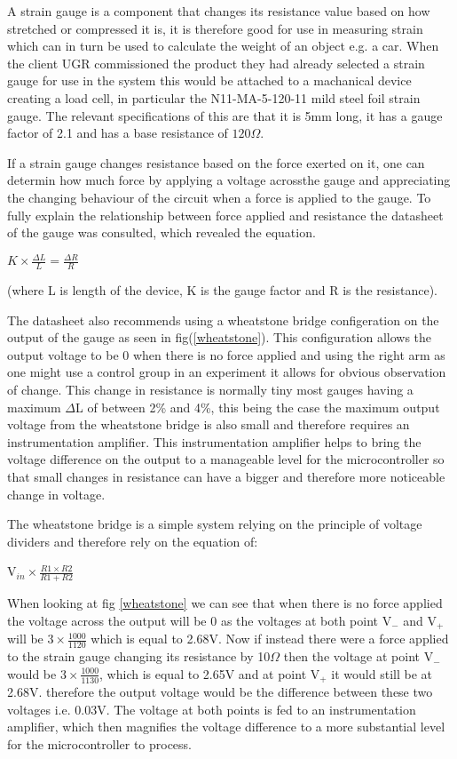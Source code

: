 A strain gauge is a component that changes its resistance value based on how stretched or compressed it is, it is therefore good for use in measuring strain which can in turn be used to calculate the weight of an object e.g. a car. When the client UGR commissioned the product they had already selected a strain gauge for use in the system this would be attached to a machanical device creating a load cell, in particular the N11-MA-5-120-11 mild steel foil strain gauge. The relevant specifications of this are that it is 5mm long, it has a gauge factor of 2.1 and has a base resistance of \(120\Omega\).

If a strain gauge changes resistance based on the force exerted on it, one can determin how much force by applying a voltage acrossthe gauge and appreciating the changing behaviour of the circuit when a force is applied to the gauge. To fully explain the relationship between force applied and resistance the datasheet of the gauge was consulted, which revealed the equation.


\centerline{\(K \times \frac{\Delta L}{L} = \frac{\Delta R}{R}\)}

 (where L is length of the device, K is the gauge factor and R is the resistance).  

The datasheet also recommends using a wheatstone bridge configeration on the output of the gauge as seen in fig(\ref{wheatstone}). This configuration allows the output voltage to be 0 when there is no force applied and using the right arm as one might use a control group in an experiment it allows for obvious observation of change. This change in resistance is normally tiny most gauges having a maximum \(\Delta\)L of between 2\% and 4\%, this being the case the maximum output voltage from the wheatstone bridge is also small and therefore requires an instrumentation amplifier. This instrumentation amplifier helps to bring the voltage difference on the output to a manageable level for the microcontroller so that small changes in resistance can have a bigger and therefore more noticeable change in voltage. 

The wheatstone bridge is a simple system relying on the principle of voltage dividers and therefore rely on the equation of:

\centerline{V\(_{in} \times \frac{R1 \times R2}{R1 + R2}\)}

When looking at fig \ref{wheatstone} we can see that when there is no force applied the voltage across the output will be 0 as the voltages at both point V\(_-\) and V\(_+\) will be \(3 \times \frac{1000}{1120}\) which is equal to 2.68V. Now if instead there were a force applied to the strain gauge changing its resistance by 10\(\Omega\) then the voltage at point V\(_-\) would be \(3 \times \frac{1000}{1130}\), which is equal to 2.65V and at point V\(_+\) it would still be at 2.68V. therefore the output voltage would be the difference between these two voltages i.e. 0.03V. The voltage at both points is fed to an instrumentation amplifier, which then magnifies the voltage difference to a more substantial level for the microcontroller to process. 

